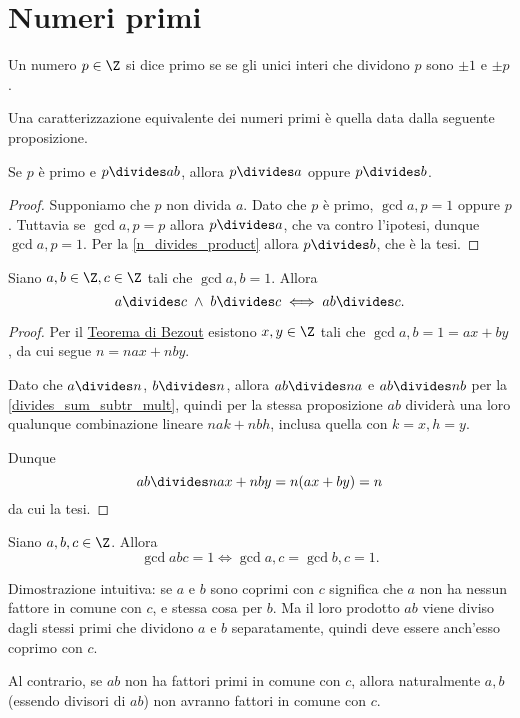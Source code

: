 
\section{Numeri primi}

\begin{definition}
    Un numero $p \in \Z$ si dice primo se se gli unici interi che dividono $p$ sono $\pm 1$ e $\pm p$.
\end{definition}

Una caratterizzazione equivalente dei numeri primi è quella data dalla seguente proposizione.

\begin{proposition}\label{primo_divide_prodotto}
    Se $p$ è primo e $p \divides ab$, allora $p \divides a$ oppure $p \divides b$.
\end{proposition}
\begin{proof}
    Supponiamo che $p$ non divida $a$. Dato che $p$ è primo, $\gcd{a, p} = 1$ oppure $p$.
    Tuttavia se $\gcd{a, p} = p$ allora $p \divides a$, che va contro l'ipotesi, dunque 
    $\gcd{a, p} = 1$. Per la \autoref{n_divides_product} allora $p \divides b$, che è la tesi.
\end{proof}

\begin{proposition} \label{prodotto_numeri_coprimi}
    Siano $a, b \in \Z, c \in \Z$ tali che $\gcd{a, b} = 1$. Allora
    \begin{equation}
        a \divides c \;\land\; b \divides c \iff ab \divides c.
    \end{equation}
\end{proposition}
\begin{proof}
    Per il \hyperref[bezout]{Teorema di Bezout} esistono $x, y \in \Z$ tali che $\gcd{a, b} = 1 = ax+by$, da cui segue $n = nax + nby$.

    Dato che $a \divides n$, $b \divides n$, allora $ab \divides na$ e $ab \divides nb$ per la \autoref{divides_sum_subtr_mult}, quindi per la stessa proposizione $ab$ dividerà una loro qualunque combinazione lineare $nak + nbh$, inclusa quella con $k = x, h = y$.

    Dunque \[
        ab \divides nax + nby = n(ax + by) = n
    \] da cui la tesi.
\end{proof}

\begin{proposition} \label{prodotto_coprimo_2}
    Siano $a, b, c \in \Z$. Allora
    \begin{equation}
        \gcd{ab}{c} = 1 \iff \gcd{a, c} = \gcd{b, c} = 1.
    \end{equation}
\end{proposition}
\begin{intuition}
    Dimostrazione intuitiva: se $a$ e $b$ sono coprimi con $c$ significa che $a$ non ha nessun fattore in comune con $c$, e stessa cosa per $b$. Ma il loro prodotto $ab$ viene diviso dagli stessi primi che dividono $a$ e $b$ separatamente, quindi deve essere anch'esso coprimo con $c$.

    Al contrario, se $ab$ non ha fattori primi in comune con $c$, allora naturalmente $a, b$ (essendo divisori di $ab$) non avranno fattori in comune con $c$.
\end{intuition}


